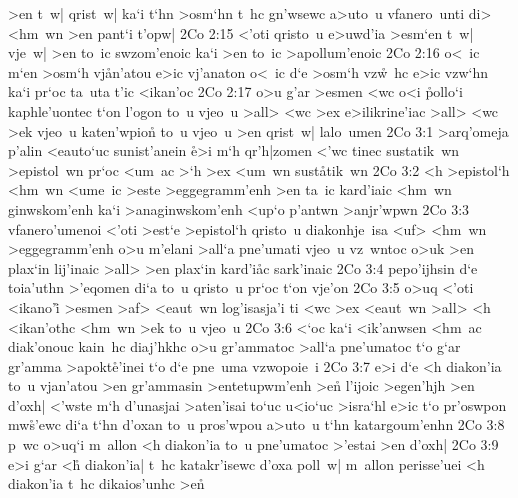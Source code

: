 >en
t~w|
qrist~w|
ka`i
t`hn
>osm`hn
t~hc
gn'wsewc
a>uto~u
vfanero~unti
di>
<hm~wn
>en
pant`i
t'opw|\bibvsend
\vs 2Co 2:15
<'oti
qristo~u
e>uwd'ia
>esm`en
t~w|
vje~w|
>en
to~ic
swzom'enoic
ka`i
>en
to~ic
>apollum'enoic\bibvsend
\vs 2Co 2:16
o<~ic
m`en
>osm`h
vj\r{a}n'atou
e>ic
vj'anaton
o<~ic
d`e
>osm`h
vz\r{w}~hc
e>ic
vzw`hn
ka`i
pr`oc
ta~uta
t'ic
<ikan'oc\bibvsend
\vs 2Co 2:17
o>u
g'ar
>esmen
<wc
o<i
\r{p}ollo`i
kaphle'uontec
t`on
l'ogon
to~u
vjeo~u
>all>
<wc
>ex
e>ilikrine'iac
>all>
<wc
>ek
vjeo~u
katen'wpion\r{}
to~u
vjeo~u
>en
qrist~w|
lalo~umen\bibvsend
\vs 2Co 3:1
>arq'omeja
p'alin
<eauto`uc
sunist'anein
\r{e}>i
m`h
qr'h|zomen
<'wc
tinec
sustatik~wn
>epistol~wn
pr`oc
<um~ac
>`h
>ex
<um~wn
su\-st\r{a}\-ti\-k~wn\bibvsend
{}
\vs 2Co 3:2
<h
>epistol`h
<hm~wn
<ume~ic
>este
>eggegramm'enh
>en
ta~ic
kard'iaic
<hm~wn
ginwskom'enh
ka`i
>anaginwskom'enh
<up`o
p'antwn
>anjr'wpwn\bibvsend
\vs 2Co 3:3
vfanero'umenoi
<'oti
>est`e
>epistol`h
qristo~u
diakonhje~isa
<uf>
<hm~wn
>eggegramm'enh
o>u
m'elani
>all`a
pne'umati
vjeo~u
vz~wntoc
o>uk
>en
plax`in
lij'inaic
>all>
>en
plax`in
kard'i\r{a}c
sark'inaic\bibvsend
\vs 2Co 3:4
pepo'ijhsin
d`e
toia'uthn
>'eqomen
di`a
to~u
qristo~u
pr`oc
t`on
vje'on\bibvsend
\vs 2Co 3:5
o>uq
<'oti
<ikano'i\r{}
>esmen
>af>
<eaut~wn
log'isasja'i
ti
<wc
>ex
<eaut~wn
>all>
<h
<ikan'othc
<hm~wn
>ek
to~u
vjeo~u\bibvsend
\vs 2Co 3:6
<`oc
ka`i
<ik'anwsen
<hm~ac
diak'onouc
kain~hc
diaj'hkhc
o>u
gr'ammatoc
>all`a
pne'umatoc
t`o
g`ar
gr'amma
>apokt\r{e}'inei
t`o
d`e
pne~uma
vzwopoie~i\bibvsend
\vs 2Co 3:7
e>i
d`e
<h
diakon'ia
to~u
vjan'atou
>en
gr'ammasin
>entetupwm'enh
>e\r{n}
l'ijoic
>egen'hjh
>en
d'oxh|
<'wste
m`h
d'unasjai
>aten'isai
to`uc
u<io`uc
>isra`hl
e>ic
t`o
pr'oswpon
mw\r{s}'ewc
di`a
t`hn
d'oxan
to~u
pros'wpou
a>uto~u
t`hn
katargoum'enhn\bibvsend
\vs 2Co 3:8
p~wc
o>uq`i
m~allon
<h
diakon'ia
to~u
pne'umatoc
>'estai
>en
d'oxh|\bibvsend
\vs 2Co 3:9
e>i
g`ar
<h\r{}
diakon'ia|
t~hc
katakr'isewc
d'oxa
poll~w|
m~allon
perisse'uei
<h
diakon'ia
t~hc
dikaios'unhc
>e\r{n}
